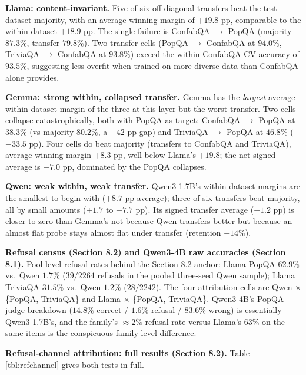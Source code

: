 \textbf{Llama: content-invariant.} Five of six off-diagonal transfers
beat the test-dataset majority, with an average winning margin of
\(+19.8\) pp, comparable to the within-dataset \(+18.9\) pp. The single
failure is ConfabQA \(\to\) PopQA (majority \(87.3\%\), transfer
\(79.8\%\)). Two transfer cells (PopQA \(\to\) ConfabQA at \(94.0\%\),
TriviaQA \(\to\) ConfabQA at \(93.8\%\)) exceed the
within-ConfabQA CV accuracy of \(93.5\%\), suggesting less overfit when
trained on more diverse data than ConfabQA alone provides.

\textbf{Gemma: strong within, collapsed transfer.} Gemma has the
\emph{largest} average within-dataset margin of the three at this layer
but the worst transfer. Two cells collapse catastrophically, both with
PopQA as target: ConfabQA \(\to\) PopQA at \(38.3\%\) (vs majority
\(80.2\%\), a \(-42\) pp gap) and TriviaQA \(\to\) PopQA at \(46.8\%\)
(\(-33.5\) pp). Four cells do beat majority (transfers to ConfabQA and
TriviaQA), average winning margin \(+8.3\) pp, well below Llama's
\(+19.8\); the net signed average is \(-7.0\) pp, dominated by the PopQA
collapses.

\textbf{Qwen: weak within, weak transfer.} Qwen3-1.7B's within-dataset
margins are the smallest to begin with (\(+8.7\) pp average); three of
six transfers beat majority, all by small amounts (\(+1.7\) to
\(+7.7\) pp). Its signed transfer average (\(-1.2\) pp) is closer to zero
than Gemma's not because Qwen transfers better but because an almost
flat probe stays almost flat under transfer (retention \(-14\%\)).


\textbf{Refusal census (Section 8.2) and Qwen3-4B raw accuracies
(Section 8.1).} Pool-level refusal rates behind
the Section 8.2 anchor: Llama PopQA \(62.9\%\) vs.~Qwen \(1.7\%\)
(\(39/2264\) refusals in the pooled three-seed Qwen sample); Llama
TriviaQA \(31.5\%\) vs.~Qwen \(1.2\%\) (\(28/2242\)). The four
attribution cells are Qwen \(\times\) \{PopQA, TriviaQA\} and Llama
\(\times\) \{PopQA, TriviaQA\}. Qwen3-4B's PopQA judge breakdown
(\(14.8\%\) correct / \(1.6\%\) refusal / \(83.6\%\) wrong) is
essentially Qwen3-1.7B's, and the family's \(\approx 2\%\) refusal rate
versus Llama's \(63\%\) on the same items is the conspicuous
family-level difference.

\textbf{Refusal-channel attribution: full results (Section 8.2).}
Table \ref{tbl:refchannel} gives both tests in full.

